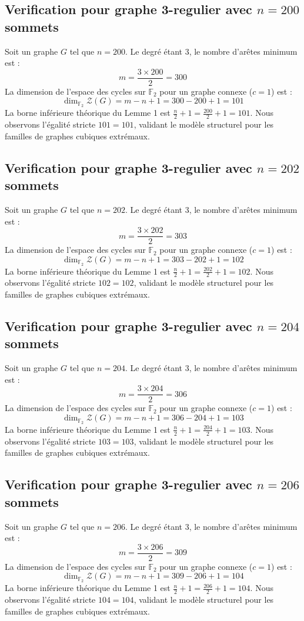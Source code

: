 \documentclass[11pt,a4paper]{article}
\begin{document}
\subsection{Verification pour graphe 3-regulier avec $n=200$ sommets}
Soit un graphe $G$ tel que $n = 200$. Le degré étant 3, le nombre d'arêtes minimum est :
$$ m = \frac{3 \times 200}{2} = 300 $$
La dimension de l'espace des cycles sur $\mathbb{F}_2$ pour un graphe connexe ($c=1$) est :
$$ \dim_{\mathbb{F}_2} \mathcal{Z}(G) = m - n + 1 = 300 - 200 + 1 = 101 $$
La borne inférieure théorique du Lemme 1 est $\frac{n}{2} + 1 = \frac{200}{2} + 1 = 101$.
Nous observons l'égalité stricte $101 = 101$, validant le modèle structurel pour les familles de graphes cubiques extrémaux.

\subsection{Verification pour graphe 3-regulier avec $n=202$ sommets}
Soit un graphe $G$ tel que $n = 202$. Le degré étant 3, le nombre d'arêtes minimum est :
$$ m = \frac{3 \times 202}{2} = 303 $$
La dimension de l'espace des cycles sur $\mathbb{F}_2$ pour un graphe connexe ($c=1$) est :
$$ \dim_{\mathbb{F}_2} \mathcal{Z}(G) = m - n + 1 = 303 - 202 + 1 = 102 $$
La borne inférieure théorique du Lemme 1 est $\frac{n}{2} + 1 = \frac{202}{2} + 1 = 102$.
Nous observons l'égalité stricte $102 = 102$, validant le modèle structurel pour les familles de graphes cubiques extrémaux.

\subsection{Verification pour graphe 3-regulier avec $n=204$ sommets}
Soit un graphe $G$ tel que $n = 204$. Le degré étant 3, le nombre d'arêtes minimum est :
$$ m = \frac{3 \times 204}{2} = 306 $$
La dimension de l'espace des cycles sur $\mathbb{F}_2$ pour un graphe connexe ($c=1$) est :
$$ \dim_{\mathbb{F}_2} \mathcal{Z}(G) = m - n + 1 = 306 - 204 + 1 = 103 $$
La borne inférieure théorique du Lemme 1 est $\frac{n}{2} + 1 = \frac{204}{2} + 1 = 103$.
Nous observons l'égalité stricte $103 = 103$, validant le modèle structurel pour les familles de graphes cubiques extrémaux.

\subsection{Verification pour graphe 3-regulier avec $n=206$ sommets}
Soit un graphe $G$ tel que $n = 206$. Le degré étant 3, le nombre d'arêtes minimum est :
$$ m = \frac{3 \times 206}{2} = 309 $$
La dimension de l'espace des cycles sur $\mathbb{F}_2$ pour un graphe connexe ($c=1$) est :
$$ \dim_{\mathbb{F}_2} \mathcal{Z}(G) = m - n + 1 = 309 - 206 + 1 = 104 $$
La borne inférieure théorique du Lemme 1 est $\frac{n}{2} + 1 = \frac{206}{2} + 1 = 104$.
Nous observons l'égalité stricte $104 = 104$, validant le modèle structurel pour les familles de graphes cubiques extrémaux.
\end{document}
